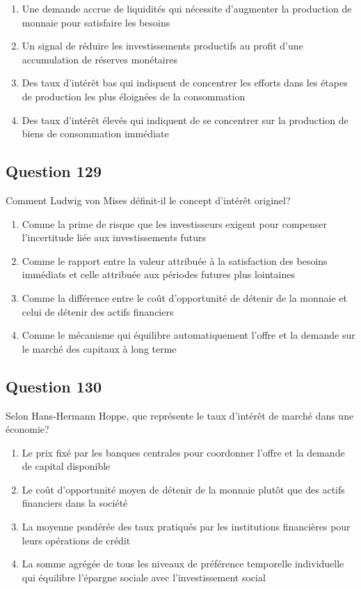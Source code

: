 \documentclass[12pt,a4paper]{article}
\begin{document}
\begin{enumerate}[label=\Alph*., leftmargin=*]
\item Une demande accrue de liquidités qui nécessite d'augmenter la production de monnaie pour satisfaire les besoins
\item Un signal de réduire les investissements productifs au profit d'une accumulation de réserves monétaires
\item Des taux d'intérêt bas qui indiquent de concentrer les efforts dans les étapes de production les plus éloignées de la consommation
\item Des taux d'intérêt élevés qui indiquent de se concentrer sur la production de biens de consommation immédiate
\end{enumerate}

\bigskip


\subsection*{Question 129}
Comment Ludwig von Mises définit-il le concept d'intérêt originel?

\begin{enumerate}[label=\Alph*., leftmargin=*]
\item Comme la prime de risque que les investisseurs exigent pour compenser l'incertitude liée aux investissements futurs
\item Comme le rapport entre la valeur attribuée à la satisfaction des besoins immédiats et celle attribuée aux périodes futures plus lointaines
\item Comme la différence entre le coût d'opportunité de détenir de la monnaie et celui de détenir des actifs financiers
\item Comme le mécanisme qui équilibre automatiquement l'offre et la demande sur le marché des capitaux à long terme
\end{enumerate}

\bigskip


\subsection*{Question 130}
Selon Hans-Hermann Hoppe, que représente le taux d'intérêt de marché dans une économie?

\begin{enumerate}[label=\Alph*., leftmargin=*]
\item Le prix fixé par les banques centrales pour coordonner l'offre et la demande de capital disponible
\item Le coût d'opportunité moyen de détenir de la monnaie plutôt que des actifs financiers dans la société
\item La moyenne pondérée des taux pratiqués par les institutions financières pour leurs opérations de crédit
\item La somme agrégée de tous les niveaux de préférence temporelle individuelle qui équilibre l'épargne sociale avec l'investissement social
\end{enumerate}
\end{document}
